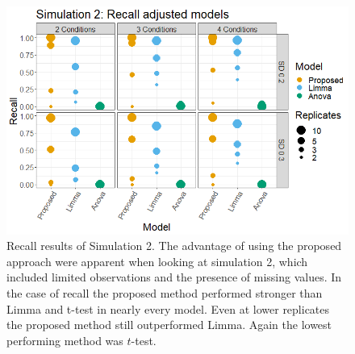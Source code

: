 \documentclass{mcp}
\begin{document}
\begin{figure}[h!]
\centering
	\includegraphics[width=.8\textwidth]{sim_new/sim3_Recall}
	\caption{}
\caption{Recall results of Simulation 2. The advantage of using the proposed approach were apparent when looking at simulation 2, which included limited observations and the presence of missing values. In the case of recall the proposed method performed stronger than Limma and t-test in nearly every model. Even at lower replicates the proposed method still outperformed Limma. Again the lowest performing method was $t$-test.}
\label{fig:sim2_recall}
\end{figure}
\end{document}
